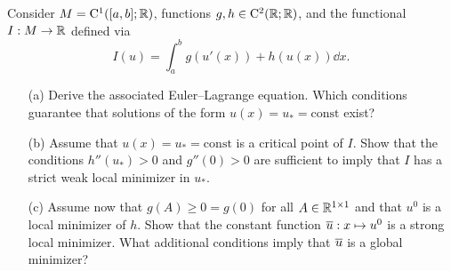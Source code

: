 \documentclass[12pt,a4paper]{article}
\begin{document}
Consider $M= {\mathrm C}^1([a,b];{\mathbb R})$, functions 
$g,h \in {\mathrm C}^2({\mathbb R};{\mathbb R})$,  and the functional $I:M\to{\mathbb R}$ defined via
\[
 I(u) = \int_a^b g(u'(x)) + h(u(x))\dd x. 
\]
\begin{itemize}
\item[(a)] Derive the associated Euler--Lagrange equation. Which
conditions guarantee that solutions of the form $u(x)=u_* =
\mathrm{const}$ exist?
\item[(b)] Assume that $u(x) = u_* = \mathrm{const}$ is a critical point
  of $I$. Show that the conditions 
$h''(u_*) > 0$ and $g''(0) > 0$ are sufficient to imply that $I$ has a
strict weak local minimizer in $u_*$.
\item[(c)]
Assume now that $g(A) \ge 0=g(0)$ for all $A \in
  {\mathbb R}^{1\times{}1}$ and that $u^0$ is a local minimizer of $h$.
Show that the constant function $\overline u:x\mapsto u^0$ is a strong local
minimizer. What additional conditions imply that $\overline u$ is a global
minimizer? 
\end{itemize}
\end{document}
